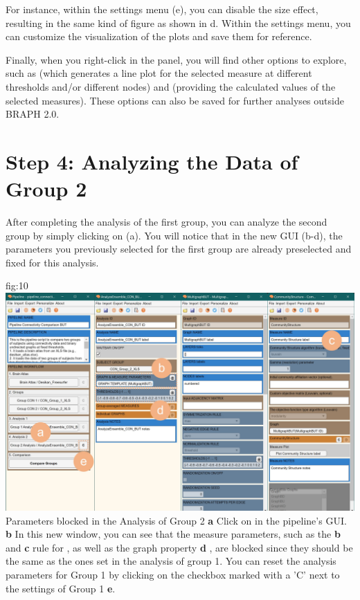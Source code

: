 \documentclass[justified]{tufte-handout}
\begin{document}
For instance, within the settings menu (e), you can disable the size effect, resulting in the same kind of figure as shown in d. Within the settings menu, you can customize the visualization of the plots and save them for reference.

Finally, when you right-click in the  panel, you will find other options to explore, such as  (which generates a line plot for the selected measure at different thresholds and/or different nodes) and  (providing the calculated values of the selected measures). These options can also be saved for further analyses outside BRAPH 2.0.

\section{Step 4: Analyzing the Data of Group 2}

After completing the analysis of the first group, you can analyze the second group by simply clicking on  (a). You will notice that in the new GUI (b-d), the parameters you previously selected for the first group are already preselected and fixed for this analysis. 

	{fig:10}
	{
	\includegraphics{fig10.jpg}
	}
	{Parameters blocked in the Analysis of Group 2}
	{
	{\bf a} Click on  in the pipeline's GUI.
	{\bf b} In this new window, you can see that the measure parameters, such as the {\bf b}  and {\bf c} rule for , as well as the graph property {\bf d} , are blocked since they should be the same as the ones set in the analysis of group 1. You can reset the analysis parameters for Group 1 by clicking on the checkbox marked with a 'C' next to the settings of Group 1 {\bf e}.
	}
	
\end{document}
